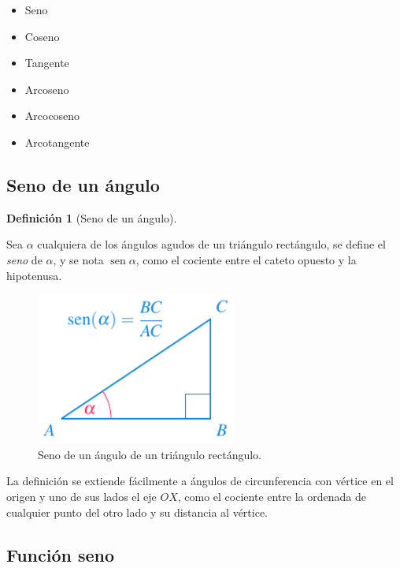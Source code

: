 \documentclass[
  a4paper,
]{scrreport}
\providecommand{\tightlist}{%
  \setlength{\itemsep}{0pt}\setlength{\parskip}{0pt}}\usepackage{longtable,booktabs,array}
\theoremstyle{definition}
\theoremstyle{plain}
\theoremstyle{definition}
\newtheorem{definition}{Definición}[chapter]
\theoremstyle{definition}
\theoremstyle{plain}
\theoremstyle{plain}
\theoremstyle{remark}
\begin{document}
\begin{itemize}
\tightlist
\item
  Seno
\item
  Coseno
\item
  Tangente
\item
  Arcoseno
\item
  Arcocoseno
\item
  Arcotangente
\end{itemize}

\subsection{Seno de un ángulo}\label{seno-de-un-uxe1ngulo}

\begin{definition}[Seno de un
ángulo]\protect\hypertarget{def-seno-angulo}{}\label{def-seno-angulo}

Sea \(\alpha\) cualquiera de los ángulos agudos de un triángulo
rectángulo, se define el \emph{seno} de \(\alpha\), y se nota
\(\operatorname{sen} \alpha\), como el cociente entre el cateto opuesto
y la hipotenusa.

\end{definition}

\begin{figure}[H]

{\centering \includegraphics[width=2.60417in,height=\textheight]{./img/funciones/seno-triangulo.pdf}

}

\caption{Seno de un ángulo de un triángulo rectángulo.}

\end{figure}%

La definición se extiende fácilmente a ángulos de circunferencia con
vértice en el origen y uno de sus lados el eje \(OX\), como el cociente
entre la ordenada de cualquier punto del otro lado y su distancia al
vértice.

\subsection{Función seno}\label{funciuxf3n-seno}
\end{document}
